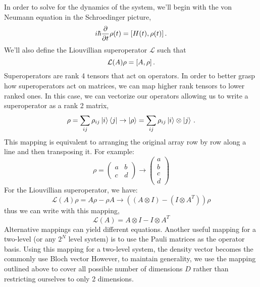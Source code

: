 In order to solve for the dynamics of the system, we'll begin with the von Neumann equation in the Schroedinger picture,
\begin{equation}
    i\hbar\partialt\rho(t) = \commutator{H(t)}{\rho(t)} \,.
\end{equation}
We'll also define the Liouvillian superoperator $\mathcal{L}$ such that
\begin{equation}
    \mathcal{L}(A)\rho=\commutator{A}{\rho} \,.
\end{equation}
Superoperators are rank 4 tensors that act on operators.
In order to better grasp how superoperators act on matrices, we can map higher rank tensors to lower ranked ones.
In this case, we can vectorize our operators allowing us to write a superoperator as a rank 2 matrix,
\begin{equation}
    \rho=\sum_{ij}\rho_{ij}\ket{i}\bra{j}\rightarrow \ket{\rho}=\sum_{ij}\rho_{ij}\ket{i}\otimes\ket{j} \,.
\end{equation}
This mapping is equivalent to arranging the original array row by row along a line and then transposing it. For example:
\begin{equation*}
    \rho=\left(\begin{matrix} a & b\\c& d\end{matrix}\right)\rightarrow\left(\begin{matrix}a\\b\\c\\d\end{matrix}\right)
\end{equation*}
For the Liouvillian superoperator, we have:
\begin{equation*}
    \mathcal{L}(A)\rho = A\rho - \rho A  \rightarrow \left((A\otimes I)-(I\otimes A^T)\right)\rho
\end{equation*}
thus we can write with this mapping,
\begin{equation}\label{EQ:mapping}
    \mathcal{L}(A) = A\otimes I - I\otimes A^T
\end{equation}
Alternative mappings can yield different equations.
Another useful mapping for a two-level (or any $2^N$ level system) is to use the Pauli matrices as the operator basis.
Using this mapping for a two-level system, the density vector becomes the commonly use Bloch vector
However, to maintain generality, we use the mapping outlined above to cover all possible number of dimensions $D$ rather than restricting ourselves to only 2 dimensions.

